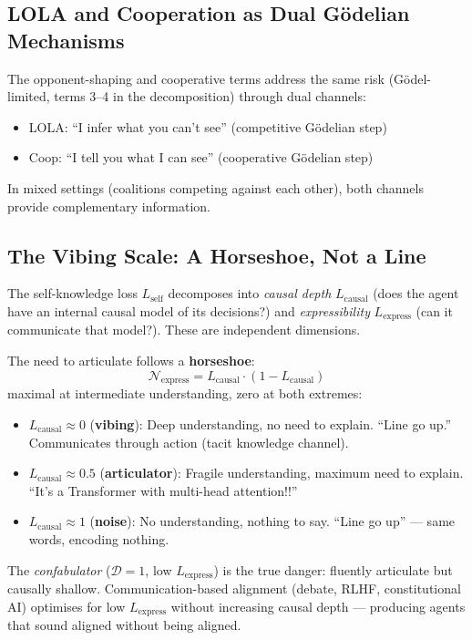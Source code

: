 \documentclass[11pt,a4paper]{article}
\begin{document}
\subsection{LOLA and Cooperation as Dual G\"odelian Mechanisms}

The opponent-shaping and cooperative terms address the same risk
(G\"odel-limited, terms 3--4 in the decomposition) through dual channels:
\begin{itemize}
    \item LOLA: ``I infer what you can't see'' (competitive G\"odelian step)
    \item Coop: ``I tell you what I can see'' (cooperative G\"odelian step)
\end{itemize}
In mixed settings (coalitions competing against each other), both
channels provide complementary information.

\subsection{The Vibing Scale: A Horseshoe, Not a Line}

The self-knowledge loss $L_{\text{self}}$ decomposes into \emph{causal depth} $L_{\text{causal}}$ (does the agent have an internal causal model of its decisions?) and \emph{expressibility} $L_{\text{express}}$ (can it communicate that model?). These are independent dimensions.

The need to articulate follows a \textbf{horseshoe}:
\begin{equation*}
    \mathcal{N}_{\text{express}} = L_{\text{causal}} \cdot (1 - L_{\text{causal}})
\end{equation*}
maximal at intermediate understanding, zero at both extremes:
\begin{itemize}
    \item $L_{\text{causal}} \approx 0$ (\textbf{vibing}): Deep understanding, no need to explain. ``Line go up.'' Communicates through action (tacit knowledge channel).
    \item $L_{\text{causal}} \approx 0.5$ (\textbf{articulator}): Fragile understanding, maximum need to explain. ``It's a Transformer with multi-head attention!!''
    \item $L_{\text{causal}} \approx 1$ (\textbf{noise}): No understanding, nothing to say. ``Line go up'' --- same words, encoding nothing.
\end{itemize}

The \emph{confabulator} ($\mathcal{D} = 1$, low $L_{\text{express}}$) is the true danger: fluently articulate but causally shallow. Communication-based alignment (debate, RLHF, constitutional AI) optimises for low $L_{\text{express}}$ without increasing causal depth --- producing agents that sound aligned without being aligned.
\end{document}
